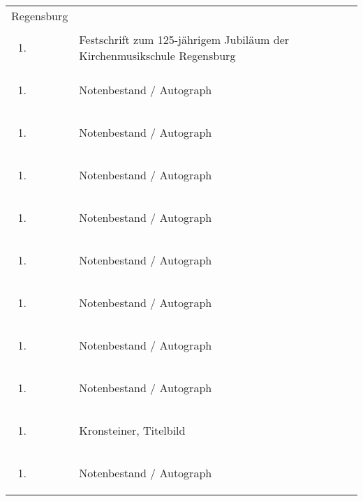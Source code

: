 \documentclass[a4paper]{article}
\begin{document}
\begin{flushleft}
\begin{supertabular}{m{1.2409999cm}m{14.604cm}}
Regensburg\\
\begin{enumerate}
\item 
\end{enumerate}
 &
Festschrift zum 125-jährigem Jubiläum der Kirchenmusikschule
Regensburg\\
\begin{enumerate}
\item 
\end{enumerate}
 &
Notenbestand / Autograph\\
\begin{enumerate}
\item 
\end{enumerate}
 &
Notenbestand / Autograph\\
\begin{enumerate}
\item 
\end{enumerate}
 &
Notenbestand / Autograph\\
\begin{enumerate}
\item 
\end{enumerate}
 &
Notenbestand / Autograph\\
\begin{enumerate}
\item 
\end{enumerate}
 &
Notenbestand / Autograph\\
\begin{enumerate}
\item 
\end{enumerate}
 &
Notenbestand / Autograph\\
\begin{enumerate}
\item 
\end{enumerate}
 &
Notenbestand / Autograph\\
\begin{enumerate}
\item 
\end{enumerate}
 &
Notenbestand / Autograph\\
\begin{enumerate}
\item 
\end{enumerate}
 &
Kronsteiner, Titelbild\\
\begin{enumerate}
\item 
\end{enumerate}
 &
Notenbestand / Autograph\\

\end{supertabular}
\end{flushleft}
\end{document}
